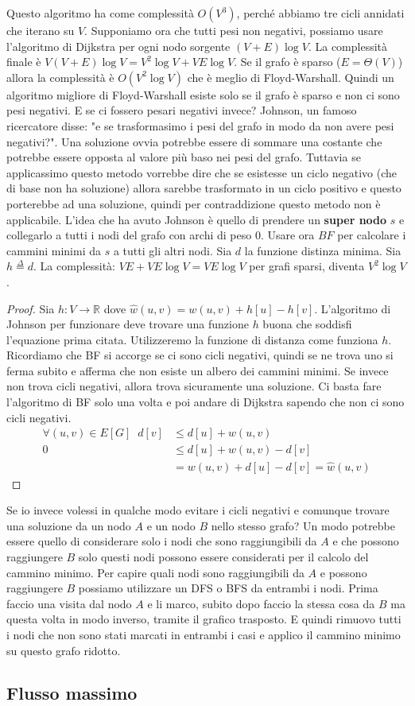 \documentclass[a4paper]{article}
\begin{document}
\noindent
Questo algoritmo ha come complessità $O(V^3)$, perché abbiamo tre cicli annidati che iterano su $V$.
Supponiamo ora che tutti pesi non negativi, possiamo usare l'algoritmo di Dijkstra per ogni nodo sorgente $(V+E)\log{V}$.
La complessità finale è $V(V+E)\log{V} = V^2\log{V} + VE\log{V}$. 
Se il grafo è sparso ($E = \Theta(V)$) allora la complessità è $O(V^2\log{V})$ che è meglio di Floyd-Warshall.
Quindi un algoritmo migliore di Floyd-Warshall esiste solo se il grafo è sparso e non ci sono pesi negativi.
E se ci fossero pesari negativi invece? Johnson, un famoso ricercatore disse: "e se trasformasimo i pesi del grafo in modo da non avere pesi negativi?".
Una soluzione ovvia potrebbe essere di sommare una costante che potrebbe essere opposta al valore più baso nei pesi del grafo.
Tuttavia se applicassimo questo metodo vorrebbe dire che se esistesse un ciclo negativo (che di base non ha soluzione) allora 
sarebbe trasformato in un ciclo positivo e questo porterebbe ad una soluzione, quindi per contraddizione questo metodo non è applicabile.
L'idea che ha avuto Johnson è quello di prendere un \textbf{super nodo} $s$ e collegarlo a tutti i nodi del grafo con archi di peso $0$.
Usare ora $BF$ per calcolare i cammini minimi da $s$ a tutti gli altri nodi.
Sia $d$ la funzione distinza minima. Sia $h \stackrel{\Delta}{=} d$. 
La complessità: $VE + VE\log{V} = VE\log{V}$ per grafi sparsi, diventa $V^2\log{V}$. 
\begin{proof}
  Sia $h : V \rightarrow \mathbb{R}$ dove $\hat{w}(u,v) = w(u,v) + h[u] - h[v]$.
  L'algoritmo di Johnson per funzionare deve trovare una funzione $h$ buona che soddisfi l'equazione prima citata. Utilizzeremo la funzione di distanza come funziona $h$.
  Ricordiamo che BF si accorge se ci sono cicli negativi, quindi se ne trova uno si ferma subito e afferma che non esiste un albero dei cammini minimi.
  Se invece non trova cicli negativi, allora trova sicuramente una soluzione. Ci basta fare l'algoritmo di BF solo una volta e poi andare di Dijkstra sapendo
  che non ci sono cicli negativi.
  \[
  \begin{aligned}
    \forall (u,v) \in E[G] \; \; d[v] &\le d[u] + w(u,v)\\
    0 &\le d[u] + w(u,v) - d[v]\\
    &= w(u,v) + d[u]- d[v] =  \hat{w}(u,v)
  \end{aligned}
  \]
\end{proof}
\noindent
Se io invece volessi in qualche modo evitare i cicli negativi e comunque trovare una soluzione da un nodo $A$ e un nodo $B$ nello stesso grafo?
Un modo potrebbe essere quello di considerare solo i nodi che sono raggiungibili da $A$ e che possono raggiungere $B$ solo questi nodi possono essere considerati per il calcolo del cammino minimo.
Per capire quali nodi sono raggiungibili da $A$ e possono raggiungere $B$ possiamo utilizzare un DFS o BFS da entrambi i nodi.
Prima faccio una visita dal nodo $A$ e li marco, subito dopo faccio la stessa cosa da $B$ ma questa volta in modo inverso, tramite il grafico trasposto.
E quindi rimuovo tutti i nodi che non sono stati marcati in entrambi i casi e applico il cammino minimo su questo grafo ridotto.

\subsection{Flusso massimo}
\end{document}
